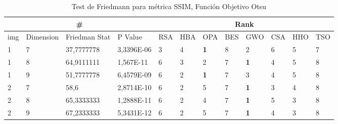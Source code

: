 \documentclass[conference]{IEEEtran}
\begin{document}
\begin{table*}[]
	\centering
	\caption{Test de Friedmann para métrica SSIM, Función Objetivo Otsu}
	\begin{tabular}{|llll|llllllll|}
		\hline
		\multicolumn{4}{|c|}{\#} & \multicolumn{8}{c|}{Rank} \\ \hline
		\multicolumn{1}{|l|}{img} & \multicolumn{1}{l|}{Dimension} & \multicolumn{1}{l|}{Friedman Stat} & P Value & \multicolumn{1}{l|}{RSA} & \multicolumn{1}{l|}{HBA} & \multicolumn{1}{l|}{OPA} & \multicolumn{1}{l|}{BES} & \multicolumn{1}{l|}{GWO} & \multicolumn{1}{l|}{CSA} & \multicolumn{1}{l|}{HHO} & TSO \\ \hline
		\multicolumn{1}{|l|}{1} & \multicolumn{1}{l|}{7} & \multicolumn{1}{l|}{37,7777778} & 3,3396E-06 & \multicolumn{1}{l|}{3} & \multicolumn{1}{l|}{4} & \multicolumn{1}{l|}{\textbf{1}} & \multicolumn{1}{l|}{8} & \multicolumn{1}{l|}{2} & \multicolumn{1}{l|}{6} & \multicolumn{1}{l|}{5} & 7 \\ \hline
		\multicolumn{1}{|l|}{1} & \multicolumn{1}{l|}{8} & \multicolumn{1}{l|}{64,9111111} & 1,567E-11 & \multicolumn{1}{l|}{6} & \multicolumn{1}{l|}{3} & \multicolumn{1}{l|}{2} & \multicolumn{1}{l|}{7} & \multicolumn{1}{l|}{\textbf{1}} & \multicolumn{1}{l|}{4} & \multicolumn{1}{l|}{5} & 8 \\ \hline
		\multicolumn{1}{|l|}{1} & \multicolumn{1}{l|}{9} & \multicolumn{1}{l|}{51,7777778} & 6,4579E-09 & \multicolumn{1}{l|}{6} & \multicolumn{1}{l|}{2} & \multicolumn{1}{l|}{\textbf{1}} & \multicolumn{1}{l|}{7} & \multicolumn{1}{l|}{3} & \multicolumn{1}{l|}{4} & \multicolumn{1}{l|}{5} & 8 \\ \hline
		\multicolumn{1}{|l|}{2} & \multicolumn{1}{l|}{7} & \multicolumn{1}{l|}{58,6} & 2,8714E-10 & \multicolumn{1}{l|}{6} & \multicolumn{1}{l|}{2} & \multicolumn{1}{l|}{5} & \multicolumn{1}{l|}{7} & \multicolumn{1}{l|}{\textbf{1}} & \multicolumn{1}{l|}{3} & \multicolumn{1}{l|}{4} & 8 \\ \hline
		\multicolumn{1}{|l|}{2} & \multicolumn{1}{l|}{8} & \multicolumn{1}{l|}{65,3333333} & 1,2888E-11 & \multicolumn{1}{l|}{6} & \multicolumn{1}{l|}{2} & \multicolumn{1}{l|}{4} & \multicolumn{1}{l|}{7} & \multicolumn{1}{l|}{\textbf{1}} & \multicolumn{1}{l|}{5} & \multicolumn{1}{l|}{3} & 8 \\ \hline
		\multicolumn{1}{|l|}{2} & \multicolumn{1}{l|}{9} & \multicolumn{1}{l|}{67,2333333} & 5,3431E-12 & \multicolumn{1}{l|}{6} & \multicolumn{1}{l|}{2} & \multicolumn{1}{l|}{5} & \multicolumn{1}{l|}{7} & \multicolumn{1}{l|}{\textbf{1}} & \multicolumn{1}{l|}{4} & \multicolumn{1}{l|}{3} & 8 \\ \hline

\end{tabular}
\end{table*}
\end{document}
